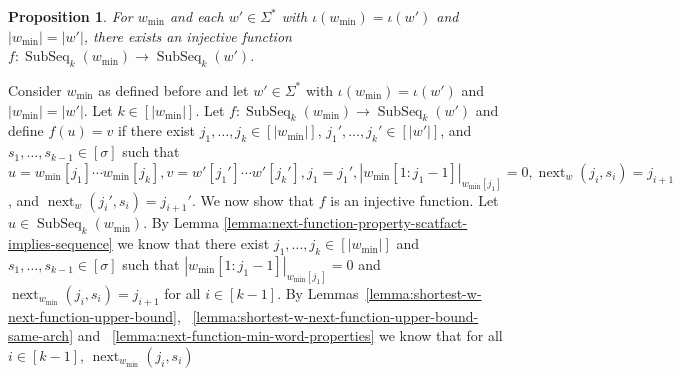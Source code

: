 \documentclass[10pt,a4paper]{amsart}
\makeatletter
\DeclareMathOperator\ScatFact{SubSeq}
\DeclareMathOperator{\nextAlphPos}{next}
\newif\ifpaper
\theoremstyle{plain}
\newtheorem{proposition}{Proposition}
\theoremstyle{definition}
\renewenvironment{proof}[1][\proofname]{\par
  \pushQED{}%
  \normalfont \topsep6\p@\@plus6\p@\relax
  \trivlist
  \item[\hskip\labelsep\itshape #1\@addpunct{.}]\ignorespaces
}{%
  \popQED\endtrivlist\@endpefalse
}
\makeatother
\begin{document}
\begin{proposition}\label{proposition:min-sf-word-injective-function}
    For $w_{\min}$ and each $w'\in\Sigma^{*}$ with
    $\iota(w_{\min}) = \iota(w')$ and $|w_{\min}| = |w'|$, there exists an injective function
    $f : \ScatFact_k(w_{\min}) \rightarrow \ScatFact_k(w')$.
\end{proposition}
\ifpaper
\begin{proof}
	Consider $w_{\min}$ as defined before and let $w'\in\Sigma^*$ with $\iota(w_{\min}) = \iota(w')$
	and $|w_{\min}| = |w'|$. Let $k\in[|w_{\min}|]$.
	Let $f : \ScatFact_k(w_{\min}) \rightarrow \ScatFact_k(w')$ and define $f(u) = v$
	if there exist $j_1,\ldots,j_k\in[|w_{\min}|]$, $j_1',\ldots,j_k'\in[|w'|]$, and $s_1,\ldots,s_{k-1}\in[\sigma]$ such that $u = w_{\min}[j_1]\cdots w_{\min}[j_k], v = w'[j_1'] \cdots w'[j_k'], j_1 = j_1',|w_{\min}[1:j_1-1]|_{w_{\min}[j_1]} = 0, \nextAlphPos_w(j_i,s_i) = j_{i+1}$, and $\nextAlphPos_w(j_i',s_i) = j_{i+1}'$.
	We now show that $f$ is an injective function.
	Let $u\in\ScatFact_k(w_{\min})$.
	By Lemma \ref{lemma:next-function-property-scatfact-implies-sequence} we know that there exist $j_1,\ldots,j_k\in[|w_{\min}|]$ and
	$s_1,\ldots,s_{k-1}\in[\sigma]$ such that $|w_{\min}[1:j_1-1]|_{w_{\min}[j_1]} = 0$ and $\nextAlphPos_{w_{\min}}(j_i,s_i) = j_{i+1}$
	for all $i\in[k-1]$.
	By Lemmas~\ref{lemma:shortest-w-next-function-upper-bound}, ~\ref{lemma:shortest-w-next-function-upper-bound-same-arch}
	and ~\ref{lemma:next-function-min-word-properties} we know that for all $i\in[k-1]$, $\nextAlphPos_{w_{\min}}(j_i,s_i)$

\end{proof}
\end{document}

